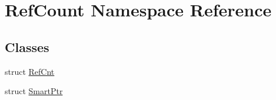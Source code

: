 \hypertarget{namespace_ref_count}{}\section{Ref\+Count Namespace Reference}
\label{namespace_ref_count}
\subsection*{Classes}
\begin{DoxyCompactItemize}
\item 
struct \hyperlink{struct_ref_count_1_1_ref_cnt}{Ref\+Cnt}
\item 
struct \hyperlink{struct_ref_count_1_1_smart_ptr}{Smart\+Ptr}
\end{DoxyCompactItemize}
